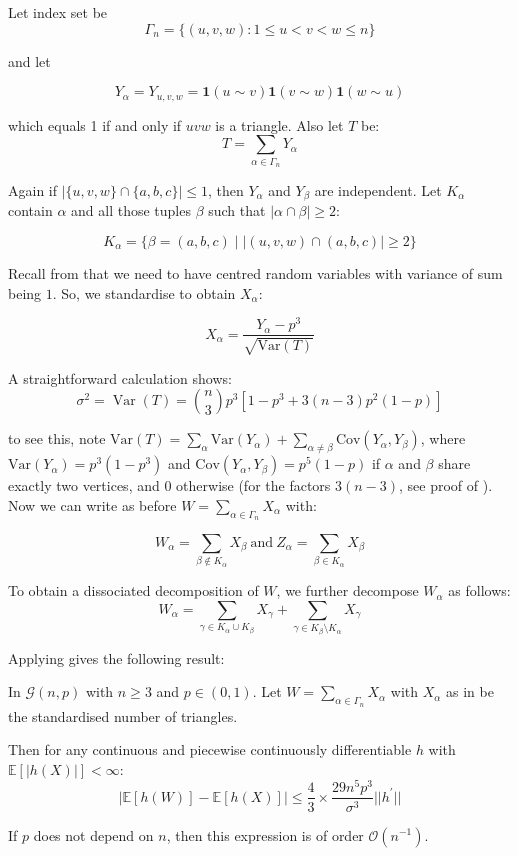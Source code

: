 \documentclass{article}
\begin{document}
Let index set be 
\[
\Gamma_n = \{(u,v,w): 1\leq u<v<w\leq n\}
\]

and let 

\[
Y_\alpha = Y_{u,v,w} = \mathbf{1}(u\sim v) \mathbf{1}(v\sim w) \mathbf{1}(w\sim u)
\]

which equals 1 if and only if $uvw$ is a triangle. Also let $T$ be:
\[
T = \sum_{\alpha \in \Gamma_n} Y_\alpha
\]

Again if $|\{u,v,w\}\cap \{a,b,c\}|\leq 1$, then $Y_\alpha$ and $Y_\beta$ are independent. Let $K_\alpha$ contain $\alpha$ and all those tuples $\beta$ such that $|\alpha\cap \beta|\geq 2$:

\begin{equation*}
    K_{\alpha} = \{\beta = (a,b,c) \mid |(u,v,w)\cap (a,b,c)|\geq 2\}
\end{equation*}

Recall from  that we need to have centred random variables with variance of sum being $1$. So, we standardise to obtain $X_\alpha$:

\begin{equation}\label{eq:standardise_triangle}    
    X_{\alpha}=\frac{Y_{\alpha}-p^{3}}{\sqrt{\mathrm{Var}(T)}}
\end{equation}


A straightforward calculation shows:
\[
    \sigma^{2}=\operatorname{Var}(T)={\binom{n}{3}}p^{3}[1-p^{3}+3(n-3)p^{2}(1-p)]
\]

to see this, note $\mathrm{Var}(T) = \sum_\alpha \mathrm{Var}(Y_\alpha) + \sum_{\alpha\neq \beta} \mathrm{Cov}(Y_\alpha, Y_\beta)$, where $\mathrm{Var}(Y_\alpha) = p^3(1-p^3)$ and $\mathrm{Cov}(Y_\alpha, Y_\beta) = p^5(1-p)$ if $\alpha$ and $\beta$ share exactly two vertices, and 0 otherwise (for the factors $3(n-3)$, see proof of ). Now we can write as before $W = \sum_{\alpha \in \Gamma_n} X_\alpha$ with:

\[
    W_{\alpha}=\sum_{\beta\notin K_{\alpha}}X_{\beta}{\mathrm{~and~}}Z_{\alpha}=\sum_{\beta\in K_{\alpha}}X_{\beta}
\]

To obtain a dissociated decomposition of $W$, we further decompose $W_\alpha$ as follows:
\[
    W_{\alpha}=\sum_{\gamma\in K_{\alpha}\cup K_{\beta}}X_{\gamma}+\sum_{\gamma\in K_{\beta}\setminus K_{\alpha}}X_{\gamma}
\]

Applying  gives the following result:

\begin{theorem}\label{thm:triangle_gnp_normal}
    In $\mathcal{G}(n,p)$ with $n\geq 3$ and $p\in (0,1)$. Let $W = \sum_{\alpha \in \Gamma_n} X_\alpha$  with $X_\alpha$ as in  be the standardised number of triangles.  
    
    Then for any continuous and piecewise continuously differentiable $h$ with $\mathbb{E}[|h(X)|]<\infty$: 
    \[
        |\mathbb{E} [h(W)]- \mathbb{E}[h(X)]| \leq \frac{4}{3}\times\frac{29n^{5}p^{3}}{\sigma^{3}}||h^{\prime}||
    \]

    If $p$ does not depend on $n$, then this expression is of order $\mathcal{O}(n^{-1})$.
\end{theorem}
\end{document}
